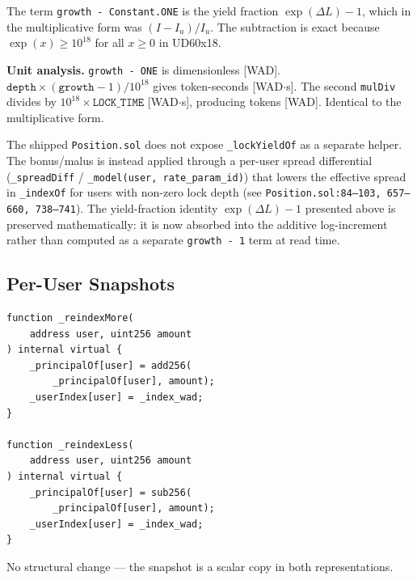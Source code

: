 \documentclass[10pt,a4paper,twocolumn]{article}
\begin{document}
The term \texttt{growth - Constant.ONE} is the yield fraction $\exp(\Delta L) - 1$, which in the multiplicative form was $(I - I_u) / I_u$. The subtraction is exact because $\exp(x) \geq 10^{18}$ for all $x \geq 0$ in UD60x18.

\textbf{Unit analysis.} \texttt{growth - ONE} is dimensionless [WAD]. $\texttt{depth} \times (\texttt{growth} - 1) / 10^{18}$ gives token-seconds [WAD$\cdot$s]. The second \texttt{mulDiv} divides by $10^{18} \times \texttt{LOCK\_TIME}$ [WAD$\cdot$s], producing tokens [WAD]. Identical to the multiplicative form.

\begin{remark}
\label{rem:lockyield-shipped}
The shipped \texttt{Position.sol} does not expose \texttt{\_lockYieldOf} as a separate helper. The bonus/malus is instead applied through a per-user spread differential (\texttt{\_spreadDiff} / \texttt{\_model(user,~rate\_param\_id)}) that lowers the effective spread in \texttt{\_indexOf} for users with non-zero lock depth (see \texttt{Position.sol:84--103, 657--660, 738--741}). The yield-fraction identity $\exp(\Delta L) - 1$ presented above is preserved mathematically: it is now absorbed into the additive log-increment rather than computed as a separate \texttt{growth - 1} term at read time.
\end{remark}

\subsection{Per-User Snapshots}
\label{subsec:snapshots}

\begin{lstlisting}[language=Solidity, caption={Snapshot operations (unchanged structure)}, label={lst:reindex-user}]
function _reindexMore(
    address user, uint256 amount
) internal virtual {
    _principalOf[user] = add256(
        _principalOf[user], amount);
    _userIndex[user] = _index_wad;
}

function _reindexLess(
    address user, uint256 amount
) internal virtual {
    _principalOf[user] = sub256(
        _principalOf[user], amount);
    _userIndex[user] = _index_wad;
}
\end{lstlisting}

No structural change --- the snapshot is a scalar copy in both representations.

\end{document}
